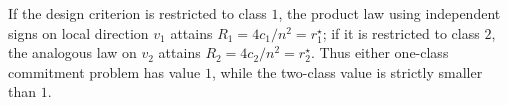 If the design criterion is restricted to class \(1\), the product law using independent signs on local direction \(v_1\) attains \(R_1=4c_1/n^2=r_1^\star\); if it is restricted to class \(2\), the analogous law on \(v_2\) attains \(R_2=4c_2/n^2=r_2^\star\). Thus either one-class commitment problem has value \(1\), while the two-class value is strictly smaller than \(1\).